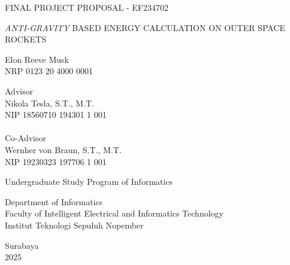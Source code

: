 \begin{large}
  FINAL PROJECT PROPOSAL - EF234702
\end{large}

\vspace{\fill}

\begin{spacing}{1.5}
  \begin{Large}
    \emph{ANTI-GRAVITY} BASED ENERGY CALCULATION ON OUTER SPACE ROCKETS
  \end{Large}
\end{spacing}

\vspace{\fill}

\begin{large}
  Elon Reeve Musk \\
  \textmd{NRP 0123 20 4000 0001}
\end{large}

\vspace{\fill}

\begin{large}
  \textmd{Advisor} \\
  Nikola Tesla, S.T., M.T. \\
  \textmd{NIP 18560710 194301 1 001} \\
  ~ \\
  \textmd{Co-Advisor} \\
  Wernher von Braun, S.T., M.T. \\
  \textmd{NIP 19230323 197706 1 001}
\end{large}

\vspace{\fill}

Undergraduate Study Program of Informatics \\

\mdseries

Department of Informatics \\
Faculty of Intelligent Electrical and Informatics Technology \\
Institut Teknologi Sepuluh Nopember

Surabaya \\
2025